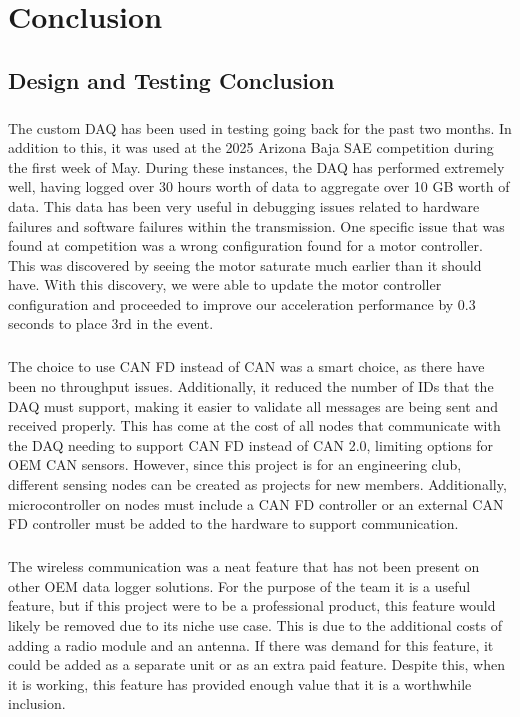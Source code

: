 \chapter{Conclusion}

\section{Design and Testing Conclusion}

\paragraph{}
The custom DAQ has been used in testing going back for the past two months.
In addition to this, it was used at the 2025 Arizona Baja SAE competition\cite{BajaArizonaPage} during the first week of May.
During these instances, the DAQ has performed extremely well, having logged over 30 hours worth of data to aggregate over 10 GB worth of data.
This data has been very useful in debugging issues related to hardware failures and software failures within the transmission.
One specific issue that was found at competition was a wrong configuration found for a motor controller.
This was discovered by seeing the motor saturate much earlier than it should have.
With this discovery, we were able to update the motor controller configuration and proceeded to improve our acceleration performance by 0.3 seconds to place 3rd in the event.

\paragraph{}
The choice to use CAN FD instead of CAN was a smart choice, as there have been no throughput issues.
Additionally, it reduced the number of IDs that the DAQ must support, making it easier to validate all messages are being sent and received properly.
This has come at the cost of all nodes that communicate with the DAQ needing to support CAN FD instead of CAN 2.0, limiting options for OEM CAN sensors.
However, since this project is for an engineering club, different sensing nodes can be created as projects for new members.
Additionally, microcontroller on nodes must include a CAN FD controller or an external CAN FD controller must be added to the hardware to support communication.

\paragraph{}
The wireless communication was a neat feature that has not been present on other OEM data logger solutions.
For the purpose of the team it is a useful feature, but if this project were to be a professional product, this feature would likely be removed due to its niche use case.
This is due to the additional costs of adding a radio module and an antenna.
If there was demand for this feature, it could be added as a separate unit or as an extra paid feature.
Despite this, when it is working, this feature has provided enough value that it is a worthwhile inclusion.

